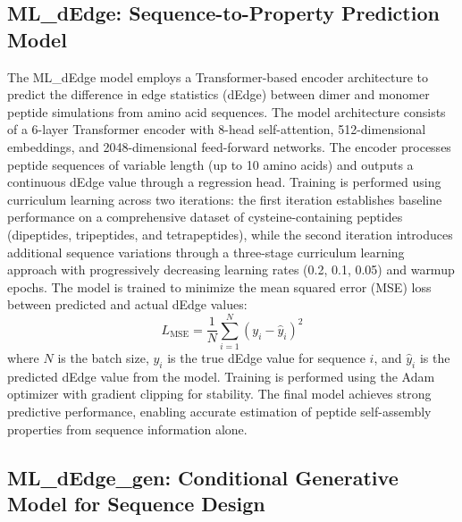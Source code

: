 \subsection{ML\_dEdge: Sequence-to-Property Prediction Model}

The ML\_dEdge model employs a Transformer-based encoder architecture to predict the difference in edge statistics (dEdge) between dimer and monomer peptide simulations from amino acid sequences.
The model architecture consists of a 6-layer Transformer encoder with 8-head self-attention, 512-dimensional embeddings, and 2048-dimensional feed-forward networks.
The encoder processes peptide sequences of variable length (up to 10 amino acids) and outputs a continuous dEdge value through a regression head.
Training is performed using curriculum learning across two iterations: the first iteration establishes baseline performance on a comprehensive dataset of cysteine-containing peptides (dipeptides, tripeptides, and tetrapeptides), while the second iteration introduces additional sequence variations through a three-stage curriculum learning approach with progressively decreasing learning rates (0.2, 0.1, 0.05) and warmup epochs.
The model is trained to minimize the mean squared error (MSE) loss between predicted and actual dEdge values:
\begin{equation}
L_{\text{MSE}} = \frac{1}{N} \sum_{i=1}^{N} (y_i - \hat{y}_i)^2
\end{equation}
where $N$ is the batch size, $y_i$ is the true dEdge value for sequence $i$, and $\hat{y}_i$ is the predicted dEdge value from the model.
Training is performed using the Adam optimizer with gradient clipping for stability.
The final model achieves strong predictive performance, enabling accurate estimation of peptide self-assembly properties from sequence information alone.

\subsection{ML\_dEdge\_gen: Conditional Generative Model for Sequence Design}

